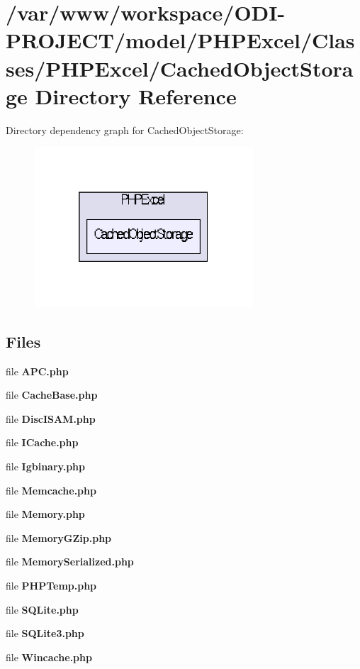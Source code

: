 \section{/var/www/workspace/\+O\+D\+I-\/\+P\+R\+O\+J\+E\+C\+T/model/\+P\+H\+P\+Excel/\+Classes/\+P\+H\+P\+Excel/\+Cached\+Object\+Storage Directory Reference}
\label{dir_3ae291005714731372548016b37df7fa}
Directory dependency graph for Cached\+Object\+Storage\+:\nopagebreak
\begin{figure}[H]
\begin{center}
\leavevmode
\includegraphics[width=232pt]{dir_3ae291005714731372548016b37df7fa_dep}
\end{center}
\end{figure}
\subsection*{Files}
\begin{DoxyCompactItemize}
\item 
file {\bfseries A\+P\+C.\+php}
\item 
file {\bfseries Cache\+Base.\+php}
\item 
file {\bfseries Disc\+I\+S\+A\+M.\+php}
\item 
file {\bfseries I\+Cache.\+php}
\item 
file {\bfseries Igbinary.\+php}
\item 
file {\bfseries Memcache.\+php}
\item 
file {\bfseries Memory.\+php}
\item 
file {\bfseries Memory\+G\+Zip.\+php}
\item 
file {\bfseries Memory\+Serialized.\+php}
\item 
file {\bfseries P\+H\+P\+Temp.\+php}
\item 
file {\bfseries S\+Q\+Lite.\+php}
\item 
file {\bfseries S\+Q\+Lite3.\+php}
\item 
file {\bfseries Wincache.\+php}
\end{DoxyCompactItemize}
